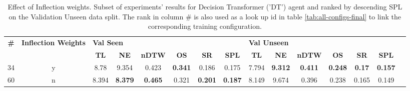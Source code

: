 \begin{table}
\centering
\caption{\label{tab:dt_inflection_weights}Effect of Inflection weights. Subset of experiments' results for Decision Transformer ('DT') agent and ranked by descending SPL on the Validation Unseen data split. The rank in column \# is also used as a look up id in table \ref{tab:all-configs-final} to link the corresponding training configuration.}
\begin{tabular}{@{\hskip3pt}c@{\hskip3pt}c@{\hskip3pt}c@{\hskip3pt}c@{\hskip3pt}c@{\hskip3pt}c@{\hskip3pt}c@{\hskip3pt}c@{\hskip3pt}c@{\hskip3pt}c@{\hskip3pt}c@{\hskip3pt}c@{\hskip3pt}c@{\hskip3pt}c@{\hskip3pt}c}
\toprule
\textbf{\#} & \textbf{Inflection Weights} & \multicolumn{6}{l}{\textbf{Val Seen}} & \multicolumn{6}{l}{\textbf{Val Unseen}} \\
 \textbf{~} &                  \textbf{~} &       \textbf{TL} &     \textbf{NE} &   \textbf{nDTW} &     \textbf{OS} &     \textbf{SR} &    \textbf{SPL} &         \textbf{TL} &     \textbf{NE} &   \textbf{nDTW} &     \textbf{OS} &    \textbf{SR} &    \textbf{SPL} \\
\midrule
         34 &                           y &              8.78 &           9.354 &           0.423 &  \textbf{0.341} &           0.186 &           0.175 &               7.794 &  \textbf{9.312} &  \textbf{0.411} &  \textbf{0.248} &  \textbf{0.17} &  \textbf{0.157} \\
         60 &                           n &             8.394 &  \textbf{8.379} &  \textbf{0.465} &           0.321 &  \textbf{0.201} &  \textbf{0.187} &               8.149 &           9.674 &           0.396 &           0.238 &          0.165 &           0.149 \\
\bottomrule
\end{tabular}
\end{table}
